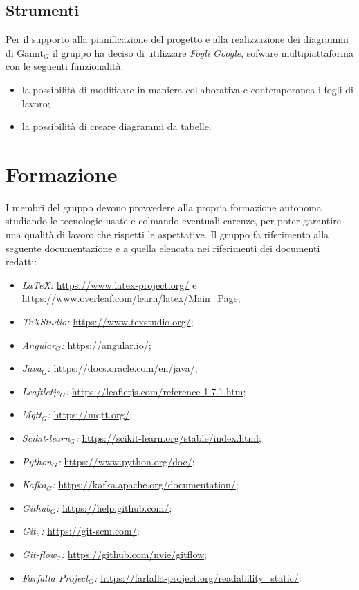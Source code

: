\subsection{Strumenti}\label{ProcessiOrganizzativiProcessoDiPianificazioneStrumenti}
Per il supporto alla pianificazione del progetto e alla realizzazione dei diagrammi di Gannt$_G$ il gruppo ha deciso di utilizzare \textit{Fogli Google}, sofware multipiattaforma con le seguenti funzionalità:
\begin{itemize}
	\item la possibilità di modificare in maniera collaborativa e contemporanea i fogli di lavoro;
	\item la possibilità di creare diagrammi da tabelle.
\end{itemize}
\section{Formazione}\label{ProcessiOrganizzativiFormazione}
I membri del gruppo devono provvedere alla propria formazione autonoma studiando le tecnologie usate e colmando eventuali carenze, per poter garantire una qualità di lavoro che rispetti le aspettative. Il gruppo fa riferimento alla seguente documentazione e a quella elencata nei riferimenti dei documenti redatti:
\begin{itemize}
	\item \textit{\LaTeX:} \url{https://www.latex-project.org/} e \url{https://www.overleaf.com/learn/latex/Main_Page};
	\item \textit{\TeX Studio:} \url{https://www.texstudio.org/};
	\item \textit{Angular$_G$:} \url{https://angular.io/};
	\item \textit{Java$_G$:} \url{https://docs.oracle.com/en/java/};
	\item \textit{Leaftletjs$_G$:} \url{https://leafletjs.com/reference-1.7.1.htm};
	\item \textit{Mqtt$_G$:} \url{https://mqtt.org/};
	\item \textit{Scikit-learn$_G$:} \url{https://scikit-learn.org/stable/index.html};
	\item \textit{Python$_G$:} \url{https://www.python.org/doc/};
	\item \textit{Kafka$_G$:} \url{https://kafka.apache.org/documentation/};
	\item \textit{Github$_G$:} \url{https://help.github.com/};
	\item \textit{Git$_{\scaleto{G}{3pt}}$:} \url{https://git-scm.com/};
	\item \textit{Git-flow$_{\scaleto{G}{3pt}}$:} \url{https://github.com/nvie/gitflow};
	\item \textit{Farfalla Project$_G$:} \url{https://farfalla-project.org/readability_static/}.
\end{itemize}